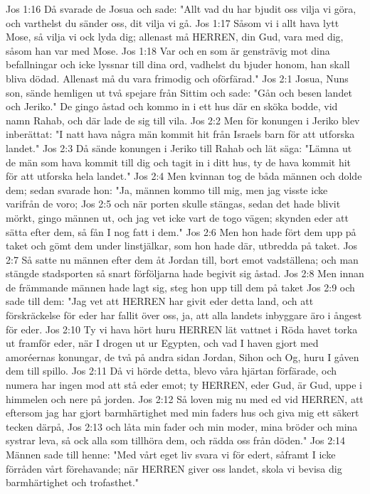 Jos 1:16  Då svarade de Josua och sade: "Allt vad du har bjudit oss vilja vi göra, och varthelst du sänder oss, dit vilja vi gå.
Jos 1:17  Såsom vi i allt hava lytt Mose, så vilja vi ock lyda dig; allenast må HERREN, din Gud, vara med dig, såsom han var med Mose.
Jos 1:18  Var och en som är gensträvig mot dina befallningar och icke lyssnar till dina ord, vadhelst du bjuder honom, han skall bliva dödad. Allenast må du vara frimodig och oförfärad."
Jos 2:1  Josua, Nuns son, sände hemligen ut två spejare från Sittim och sade: "Gån och besen landet och Jeriko." De gingo åstad och kommo in i ett hus där en sköka bodde, vid namn Rahab, och där lade de sig till vila.
Jos 2:2  Men för konungen i Jeriko blev inberättat: "I natt hava några män kommit hit från Israels barn för att utforska landet."
Jos 2:3  Då sände konungen i Jeriko till Rahab och lät säga: "Lämna ut de män som hava kommit till dig och tagit in i ditt hus, ty de hava kommit hit för att utforska hela landet."
Jos 2:4  Men kvinnan tog de båda männen och dolde dem; sedan svarade hon: "Ja, männen kommo till mig, men jag visste icke varifrån de voro;
Jos 2:5  och när porten skulle stängas, sedan det hade blivit mörkt, gingo männen ut, och jag vet icke vart de togo vägen; skynden eder att sätta efter dem, så fån I nog fatt i dem."
Jos 2:6  Men hon hade fört dem upp på taket och gömt dem under linstjälkar, som hon hade där, utbredda på taket.
Jos 2:7  Så satte nu männen efter dem åt Jordan till, bort emot vadställena; och man stängde stadsporten så snart förföljarna hade begivit sig åstad.
Jos 2:8  Men innan de främmande männen hade lagt sig, steg hon upp till dem på taket
Jos 2:9  och sade till dem: "Jag vet att HERREN har givit eder detta land, och att förskräckelse för eder har fallit över oss, ja, att alla landets inbyggare äro i ångest för eder.
Jos 2:10  Ty vi hava hört huru HERREN lät vattnet i Röda havet torka ut framför eder, när I drogen ut ur Egypten, och vad I haven gjort med amoréernas konungar, de två på andra sidan Jordan, Sihon och Og, huru I gåven dem till spillo.
Jos 2:11  Då vi hörde detta, blevo våra hjärtan förfärade, och numera har ingen mod att stå eder emot; ty HERREN, eder Gud, är Gud, uppe i himmelen och nere på jorden.
Jos 2:12  Så loven mig nu med ed vid HERREN, att eftersom jag har gjort barmhärtighet med min faders hus och giva mig ett säkert tecken därpå,
Jos 2:13  och låta min fader och min moder, mina bröder och mina systrar leva, så ock alla som tillhöra dem, och rädda oss från döden."
Jos 2:14  Männen sade till henne: "Med vårt eget liv svara vi för edert, såframt I icke förråden vårt förehavande; när HERREN giver oss landet, skola vi bevisa dig barmhärtighet och trofasthet."
